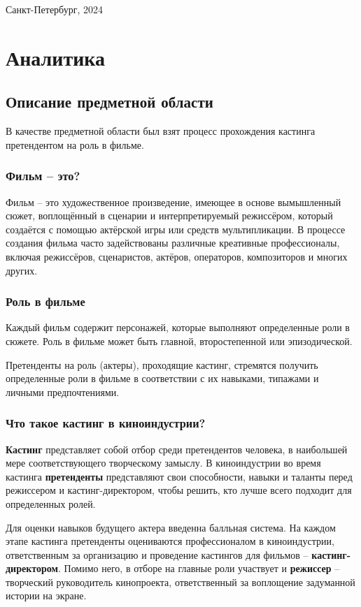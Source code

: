 \documentclass[11pt,a4paper,final]{article} %
\begin{document}
	\begin{center}
		{\large Санкт-Петербург, 2024}
	\end{center}
	
	\newpage
	
\tableofcontents

\newpage	
\section{Аналитика}
\subsection{Описание предметной области}
\par В качестве предметной области был взят процесс прохождения кастинга претендентом на роль в фильме.

\subsubsection{Фильм -- это?}
\par Фильм -- это художественное произведение, имеющее в основе вымышленный сюжет, воплощённый в сценарии и интерпретируемый режиссёром, который создаётся с помощью актёрской игры или средств мультипликации. В процессе создания фильма часто задействованы различные креативные профессионалы, включая режиссёров, сценаристов, актёров, операторов, композиторов и многих других.

\subsubsection{Роль в фильме}
\par Каждый фильм содержит персонажей, которые выполняют определенные роли в сюжете. Роль в фильме может быть главной, второстепенной или эпизодической. 
\par Претенденты на роль (актеры), проходящие кастинг, стремятся получить определенные роли в фильме в соответствии с их навыками, типажами и личными предпочтениями. 

\subsubsection{Что такое кастинг в киноиндустрии?}
\par \textbf{Кастинг} представляет собой отбор среди претендентов человека, в наибольшей мере соответствующего творческому замыслу. В киноиндустрии во время кастинга \textbf{претенденты} представляют свои способности, навыки и таланты перед режиссером и кастинг-директором, чтобы решить, кто лучше всего подходит для определенных ролей. 
\par Для оценки навыков будущего актера введенна балльная система. На каждом этапе кастинга претенденты оцениваются 
профессионалом в киноиндустрии, ответственным за организацию и проведение кастингов для фильмов -- \textbf{кастинг-директором}. Помимо него, в отборе на главные роли участвует и \textbf{режиссер} -- творческий руководитель кинопроекта, ответственный за воплощение задуманной истории на экране. 
\end{document}
